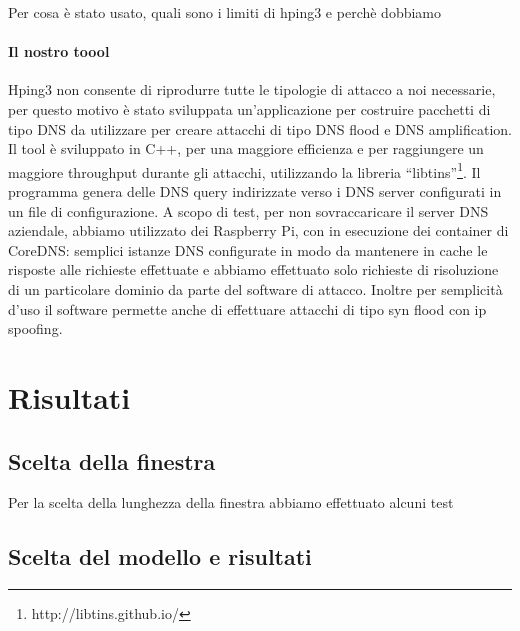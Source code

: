 Per cosa è stato usato, quali sono i limiti di hping3 e perchè dobbiamo

\paragraph{Il nostro toool}

Hping3 non consente di riprodurre tutte le tipologie di attacco a noi necessarie, per questo motivo è stato sviluppata un'applicazione per costruire pacchetti di tipo DNS da utilizzare per creare attacchi di tipo DNS flood e DNS amplification.
Il tool è sviluppato in C++, per una maggiore efficienza e per raggiungere un maggiore throughput durante gli attacchi, utilizzando la libreria ``libtins''\footnote{ http://libtins.github.io/}.
Il programma genera delle DNS query indirizzate verso i DNS server configurati in un file di configurazione. A scopo di test, per non sovraccaricare il server DNS aziendale, abbiamo utilizzato dei Raspberry Pi, con in esecuzione dei container di CoreDNS: semplici istanze DNS configurate in modo da mantenere in cache le risposte alle richieste effettuate e abbiamo effettuato solo richieste di risoluzione di un particolare dominio da parte del software di attacco.
Inoltre per semplicità d'uso il software permette anche di effettuare attacchi di tipo syn flood con ip spoofing.


\section{Risultati}

\subsection{Scelta della finestra}

Per la scelta della lunghezza della finestra abbiamo effettuato alcuni test

\subsection{Scelta del modello e risultati}